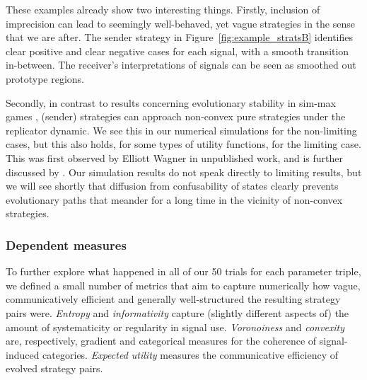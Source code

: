 These examples already show two interesting things. Firstly, inclusion
of imprecision can lead to seemingly well-behaved, yet vague
strategies in the sense that we are after. The sender strategy in
Figure~\ref{fig:example_stratsB} identifies clear positive and clear
negative cases for each signal, with a smooth transition
in-between. The receiver's interpretations of signals can be seen as
smoothed out prototype regions.

Secondly, in contrast to results concerning evolutionary stability in
sim-max games
\citep{Jager2007:The-Evolution-o,JagerMetzger2011:Voronoi-Languag},
(sender) strategies can approach non-convex pure strategies under the
replicator dynamic. We see this in our numerical simulations for the
non-limiting cases, but this also holds, for some types of utility
functions, for the limiting case. This was first observed by Elliott
Wagner in unpublished work, and is further discussed by
\citet{OConnor2013:Evolving-Percep}. Our simulation results do not
speak directly to limiting results, but we will see shortly that
diffusion from confusability of states clearly prevents evolutionary
paths that meander for a long time in the vicinity of non-convex
strategies.



\subsubsection{Dependent measures}
 
To further explore what happened in all of our 50 trials for each
parameter triple, we defined a small number of metrics that aim to
capture numerically how vague, communicatively efficient and generally
well-structured the resulting strategy pairs were. \emph{Entropy} and
\emph{informativity} capture (slightly different aspects of) the
amount of systematicity or regularity in signal
use. \emph{Voronoiness} and \emph{convexity} are, respectively,
gradient and categorical measures for the coherence of signal-induced
categories. \emph{Expected utility} measures the communicative
efficiency of evolved strategy pairs.

